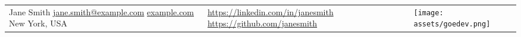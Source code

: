 \begin{tabularx}{\linewidth}{@{} m{} m{} m{} @{}}
{
    \large{Jane Smith}
    \newline
    \small{
        \href{mailto:jane.smith@example.com}{jane.smith@example.com}
        \newline
        \href{https://example.com}{example.com}
        \newline
        New York, USA
    }
} &
{
    \large{\hspace{0cm}}
    \newline
    \small{
        \href{https://linkedin.com/in/janesmith}{https://linkedin.com/in/janesmith}
        \newline
        \href{https://github.com/janesmith}{https://github.com/janesmith}
        \newline
    }
} &
{
    \texttt{[image: assets/goedev.png]}
}
\end{tabularx}
